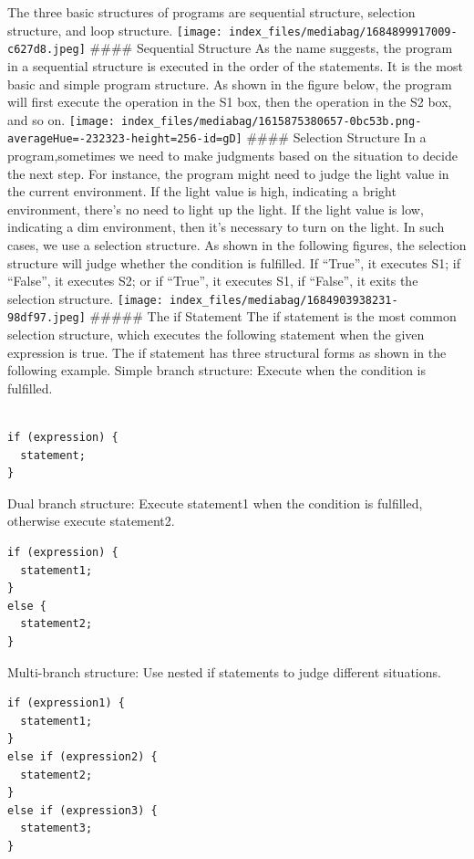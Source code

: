 \documentclass[
  letterpaper,
  DIV=11,
  numbers=noendperiod]{scrreprt}
\begin{document}
The three basic structures of programs are sequential structure,
selection structure, and loop structure.
\texttt{[image: index\_files/mediabag/1684899917009-c627d8.jpeg]}
\#\#\#\# Sequential Structure As the name suggests, the program in a
sequential structure is executed in the order of the statements. It is
the most basic and simple program structure. As shown in the figure
below, the program will first execute the operation in the S1 box, then
the operation in the S2 box, and so on.
\texttt{[image: index\_files/mediabag/1615875380657-0bc53b.png-averageHue=-232323-height=256-id=gD]}
\#\#\#\# Selection Structure In a program,sometimes we need to make
judgments based on the situation to decide the next step. For instance,
the program might need to judge the light value in the current
environment. If the light value is high, indicating a bright
environment, there's no need to light up the light. If the light value
is low, indicating a dim environment, then it's necessary to turn on the
light. In such cases, we use a selection structure. As shown in the
following figures, the selection structure will judge whether the
condition is fulfilled. If ``True'', it executes S1; if ``False'', it
executes S2; or if ``True'', it executes S1, if ``False'', it exits the
selection structure.
\texttt{[image: index\_files/mediabag/1684903938231-98df97.jpeg]}
\#\#\#\#\# The if Statement The if statement is the most common
selection structure, which executes the following statement when the
given expression is true. The if statement has three structural forms as
shown in the following example. Simple branch structure: Execute when
the condition is fulfilled.

\begin{verbatim}

if (expression) {
  statement;
}
\end{verbatim}

Dual branch structure: Execute statement1 when the condition is
fulfilled, otherwise execute statement2.

\begin{verbatim}
if (expression) {
  statement1;
}
else {
  statement2;
}
\end{verbatim}

Multi-branch structure: Use nested if statements to judge different
situations.

\begin{verbatim}
if (expression1) {
  statement1;
}
else if (expression2) {
  statement2;
}
else if (expression3) {
  statement3;
}
\end{verbatim}
\end{document}
